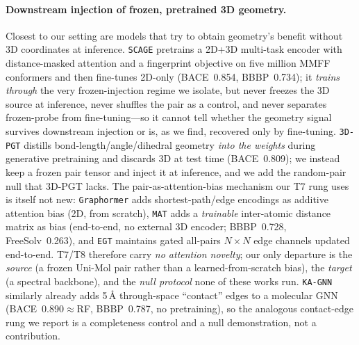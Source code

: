 \documentclass[sigconf,nonacm,anonymous,review]{acmart}
\begin{document}
\paragraph{Downstream injection of frozen, pretrained 3D geometry.}
Closest to our setting are models that try to obtain geometry's benefit without
3D coordinates at inference. \texttt{SCAGE} \citep{qiao2025scage} pretrains a
2D+3D multi-task encoder with distance-masked attention and a fingerprint
objective on five million MMFF conformers and then fine-tunes 2D-only
(BACE~0.854, BBBP~0.734); it \emph{trains through} the very frozen-injection
regime we isolate, but never freezes the 3D source at inference, never shuffles
the pair as a control, and never separates frozen-probe from fine-tuning---so it
cannot tell whether the geometry signal survives downstream injection or is, as
we find, recovered only by fine-tuning. \texttt{3D-PGT} \citep{wang2023threedpgt}
distills bond-length/angle/dihedral geometry \emph{into the weights} during
generative pretraining and discards 3D at test time (BACE~0.809); we instead
keep a frozen pair tensor and inject it at inference, and we add the random-pair
null that 3D-PGT lacks. The pair-as-attention-bias mechanism our T7 rung uses is
itself not new: \texttt{Graphormer} \citep{ying2021graphormer} adds
shortest-path/edge encodings as additive attention bias (2D, from scratch),
\texttt{MAT} \citep{maziarka2020mat} adds a \emph{trainable} inter-atomic
distance matrix as bias (end-to-end, no external 3D encoder; BBBP~0.728,
FreeSolv~0.263), and \texttt{EGT} \citep{hussain2022egt} maintains gated
all-pairs $N\times N$ edge channels updated end-to-end. T7/T8 therefore carry
\emph{no attention novelty}; our only departure is the \emph{source}
(a frozen Uni-Mol pair rather than a learned-from-scratch bias), the
\emph{target} (a spectral backbone), and the \emph{null protocol} none of these
works run. \texttt{KA-GNN} \citep{li2025kagnn} similarly already adds 5\,\AA{}
through-space ``contact'' edges to a molecular GNN (BACE~0.890$\approx$RF,
BBBP~0.787, no pretraining), so the analogous contact-edge rung we report is a
completeness control and a null demonstration, not a contribution.
\end{document}
